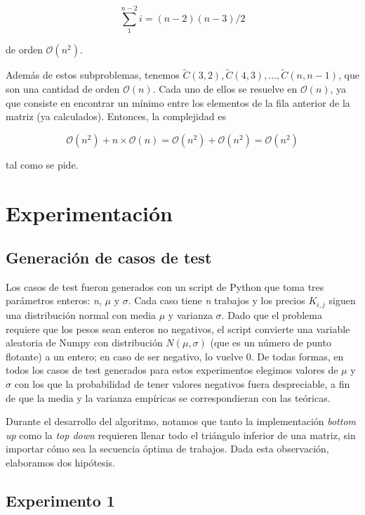 \documentclass[a4paper]{report}
\begin{document}
$$
\sum_{1}^{n-2} i = (n-2) (n-3) / 2
$$

de orden $\mathcal{O}(n^2)$.

Además de estos subproblemas, tenemos $\tilde{C}(3,2), \tilde{C}(4,3),...,\tilde{C}(n,n-1)$, que son una cantidad de orden $\mathcal{O}(n)$. Cada uno de ellos se resuelve en $\mathcal{O}(n)$, ya que consiste en encontrar un mínimo entre los elementos de la fila anterior de la matriz (ya calculados). Entonces, la complejidad es

$$
\mathcal{O}(n^2) + n \times \mathcal{O}(n) = \mathcal{O}(n^2) + \mathcal{O}(n^2) = \mathcal{O}(n^2)
$$

tal como se pide.

\section{Experimentación}

\subsection{Generación de casos de test}

Los casos de test fueron generados con un script de Python que toma tres parámetros enteros: \textit{n}, $\mu$ y $\sigma$. Cada caso tiene \textit{n} trabajos y los precios $K_{i,j}$ siguen una distribución normal con media $\mu$ y varianza $\sigma$. Dado que el problema requiere que los pesos sean enteros no negativos, el script convierte una variable aleatoria de Numpy con distribución $N(\mu, \sigma)$ (que es un número de punto flotante) a un entero; en caso de ser negativo, lo vuelve 0. De todas formas, en todos los casos de test generados para estos experimentos elegimos valores de $\mu$ y $\sigma$ con los que la probabilidad de tener valores negativos fuera despreciable, a fin de que la media y la varianza empíricas se correspondieran con las teóricas.

\medskip

Durante el desarrollo del algoritmo, notamos que tanto la implementación \textit{bottom up} como la \textit{top down} requieren llenar todo el triángulo inferior de una matriz, sin importar cómo sea la secuencia óptima de trabajos. Dada esta observación, elaboramos dos hipótesis.

\subsection{Experimento 1}
\end{document}
